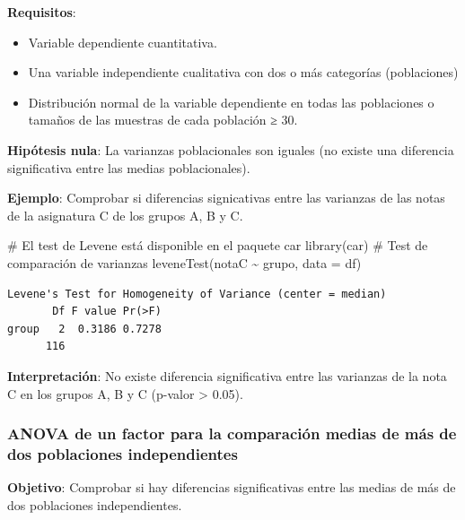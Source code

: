 \documentclass[
  a4paper,
]{scrreport}
\newenvironment{Shaded}{\begin{snugshade}}{\end{snugshade}}
\newcommand{\AttributeTok}[1]{\textcolor[rgb]{0.40,0.45,0.13}{#1}}
\newcommand{\CommentTok}[1]{\textcolor[rgb]{0.37,0.37,0.37}{#1}}
\newcommand{\FunctionTok}[1]{\textcolor[rgb]{0.28,0.35,0.67}{#1}}
\newcommand{\NormalTok}[1]{\textcolor[rgb]{0.00,0.23,0.31}{#1}}
\newcommand{\SpecialCharTok}[1]{\textcolor[rgb]{0.37,0.37,0.37}{#1}}
\providecommand{\tightlist}{%
  \setlength{\itemsep}{0pt}\setlength{\parskip}{0pt}}\usepackage{longtable,booktabs,array}
\theoremstyle{definition}
\theoremstyle{definition}
\theoremstyle{remark}
\begin{document}
\textbf{Requisitos}:

\begin{itemize}
\tightlist
\item
  Variable dependiente cuantitativa.
\item
  Una variable independiente cualitativa con dos o más categorías
  (poblaciones)
\item
  Distribución normal de la variable dependiente en todas las
  poblaciones o tamaños de las muestras de cada población ≥ 30.
\end{itemize}

\textbf{Hipótesis nula}: La varianzas poblacionales son iguales (no
existe una diferencia significativa entre las medias poblacionales).

\textbf{Ejemplo}: Comprobar si diferencias signicativas entre las
varianzas de las notas de la asignatura C de los grupos A, B y C.

\begin{Shaded}
\begin{Highlighting}[]
\CommentTok{\# El test de Levene está disponible en el paquete car}
\FunctionTok{library}\NormalTok{(car)}
\CommentTok{\# Test de comparación de varianzas}
\FunctionTok{leveneTest}\NormalTok{(notaC }\SpecialCharTok{\textasciitilde{}}\NormalTok{ grupo, }\AttributeTok{data =}\NormalTok{ df)}
\end{Highlighting}
\end{Shaded}

\begin{verbatim}
Levene's Test for Homogeneity of Variance (center = median)
       Df F value Pr(>F)
group   2  0.3186 0.7278
      116               
\end{verbatim}

\textbf{Interpretación}: No existe diferencia significativa entre las
varianzas de la nota C en los grupos A, B y C (p-valor \textgreater{}
0.05).

\hypertarget{anova-de-un-factor-para-la-comparaciuxf3n-medias-de-muxe1s-de-dos-poblaciones-independientes}{%
\subsubsection{ANOVA de un factor para la comparación medias de más de
dos poblaciones
independientes}\label{anova-de-un-factor-para-la-comparaciuxf3n-medias-de-muxe1s-de-dos-poblaciones-independientes}}

\textbf{Objetivo}: Comprobar si hay diferencias significativas entre las
medias de más de dos poblaciones independientes.
\end{document}
